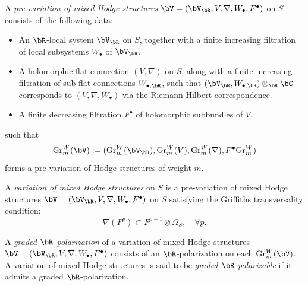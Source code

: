 \documentclass[11pt,letterpaper]{amsart}
\numberwithin{equation}{section}
\begin{document}
	\begin{defn}  
		A \emph{pre-variation of mixed Hodge structures} $\bV = (\bV_{\bR}, V, \nabla, W_\bullet, F^\bullet)$ on $S$ consists of the following data:  
		\begin{itemize}  
			\item An $\bR$-local system $\bV_{\bR}$ on $S$, together with a finite increasing filtration of local subsystems $W_\bullet$ of $\bV_{\bR}$.  
			\item A holomorphic flat connection $(V, \nabla)$ on $S$, along with a finite increasing filtration of sub flat connections $W_{\bullet,\bR}$, such that $(\bV_{\bR}, W_{\bullet,\bR}) \otimes_{\bR} \bC$ corresponds to $(V, \nabla, W_\bullet)$ via the Riemann-Hilbert correspondence.  
			\item A finite decreasing filtration $F^\bullet$ of holomorphic subbundles of $V$,  
		\end{itemize}  
		such that  
		$$
		{\rm Gr}^W_m(\bV) := ({\rm Gr}^W_m(\bV_{\bR}), {\rm Gr}^W_m(V), {\rm Gr}^W_m(\nabla), F^\bullet {\rm Gr}^W_m)
		$$  
		forms a pre-variation of Hodge structures of weight $m$.  
		
		A \emph{variation of mixed Hodge structures} on $S$ is a pre-variation of mixed Hodge structures $\bV = (\bV_{\bR}, V, \nabla, W_\bullet, F^\bullet)$ on $S$ satisfying the Griffiths transversality condition:  
		$$
		\nabla(F^p) \subset F^{p-1} \otimes \Omega_S, \quad \forall p.
		$$  
		
		A \emph{graded $\bR$-polarization} of a variation of mixed Hodge structures $\bV = (\bV_{\bR}, V, \nabla, W_\bullet, F^\bullet)$ consists of an $\bR$-polarization on each ${\rm Gr}^W_m(\bV)$. A variation of mixed Hodge structures is said to be \emph{graded $\bR$-polarizable} if it admits a graded $\bR$-polarization.  
	\end{defn}  
	\iffalse
\end{document}

